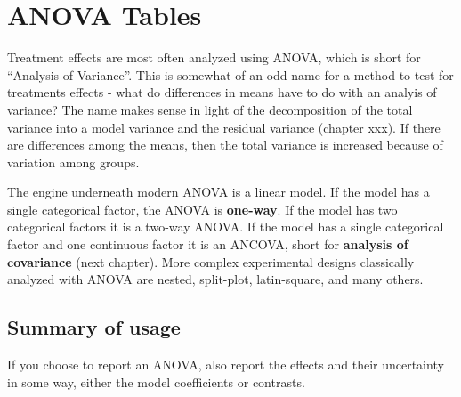 \documentclass[]{book}
\begin{document}
\hypertarget{anova-tables}{%
\chapter{ANOVA Tables}\label{anova-tables}}

Treatment effects are most often analyzed using ANOVA, which is short for ``Analysis of Variance''. This is somewhat of an odd name for a method to test for treatments effects - what do differences in means have to do with an analyis of variance? The name makes sense in light of the decomposition of the total variance into a model variance and the residual variance (chapter xxx). If there are differences among the means, then the total variance is increased because of variation among groups.

The engine underneath modern ANOVA is a linear model. If the model has a single categorical factor, the ANOVA is \textbf{one-way}. If the model has two categorical factors it is a two-way ANOVA. If the model has a single categorical factor and one continuous factor it is an ANCOVA, short for \textbf{analysis of covariance} (next chapter). More complex experimental designs classically analyzed with ANOVA are nested, split-plot, latin-square, and many others.

\hypertarget{summary-of-usage}{%
\section{Summary of usage}\label{summary-of-usage}}

If you choose to report an ANOVA, also report the effects and their uncertainty in some way, either the model coefficients or contrasts.
\end{document}
